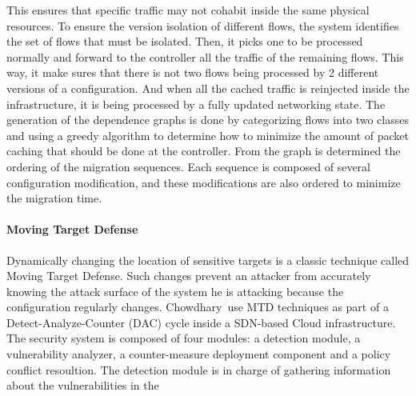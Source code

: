This ensures that specific traffic may not cohabit inside the same physical resources.
To ensure the version isolation of different flows, the system identifies the set of flows that must be isolated. Then, it picks one to be processed normally and forward to the controller all the traffic of the remaining flows. This way, it make sures that there is not two flows being processed by 2 different versions of a configuration. And when all the cached traffic is reinjected inside the infrastructure, it is being processed by a fully updated networking state.
The generation of the dependence graphs is done by categorizing flows into two classes and using a greedy algorithm to determine how to minimize the amount of packet caching that should be done at the controller.
From the graph is determined the ordering of the migration sequences. Each sequence is composed of several configuration modification, and these modifications are also ordered to minimize the migration time. 

\paragraph{Moving Target Defense} Dynamically changing the location of sensitive targets is a classic technique called Moving Target Defense. Such changes prevent an attacker from accurately knowing the attack surface of the system he is attacking because the configuration regularly changes. Chowdhary~\etal use MTD techniques as part of a Detect-Analyze-Counter (DAC) cycle inside a SDN-based Cloud infrastructure. 
The security system is composed of four modules: a detection module, a vulnerability analyzer, a counter-measure deployment component and a policy conflict resoultion.
The detection module is in charge of gathering information about the vulnerabilities in the 





\cite{coconut-ghorbani2017,toward-Ghorbani2014,Chowdhary2016}


